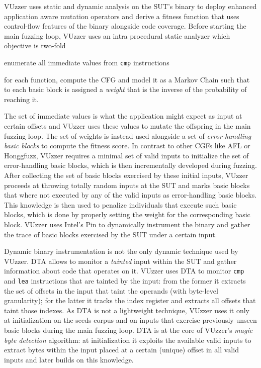 VUzzer uses static and dynamic analysis on the \ac{SUT}'s binary to deploy
enhanced application aware mutation operators and derive a fitness function that
uses control-flow features of the binary alongside code coverage. Before
starting the main fuzzing loop, VUzzer uses an intra procedural static analyzer
which objective is two-fold
\begin{enumeratein}
    \item enumerate all immediate values from \texttt{cmp} instructions
    \item for each function, compute the \ac{CFG} and model it as a Markov Chain
        such that to each basic block is assigned a \emph{weight} that is the
        inverse of the probability of reaching it.
\end{enumeratein}
The set of immediate values is what the application might expect as input at
certain offsets and VUzzer uses these values to mutate the offspring in the main
fuzzing loop. The set of weights is instead used alongside a set of
\emph{error-handling basic blocks} to compute the fitness score. In contrast to
other \acp{CGF} like AFL or Honggfuzz, VUzzer requires a minimal set of valid
inputs to initialize the set of error-handling basic blocks, which is then
incrementally developed during fuzzing. After collecting the set of basic blocks
exercised by these initial inputs, VUzzer proceeds at throwing totally random
inputs at the \ac{SUT} and marks basic blocks that where not executed by any of
the valid inputs as error-handling basic blocks. This knowledge is then used to
penalize individuals that execute such basic blocks, which is done by properly
setting the weight for the corresponding basic block. VUzzer uses Intel's Pin
\cite{luk2005pin} to dynamically instrument the binary and gather the trace of
basic blocks exercised by the \ac{SUT} under a certain input.

Dynamic binary instrumentation is not the only dynamic technique used by VUzzer.
\ac{DTA} allows to monitor a \emph{tainted} input within the \ac{SUT} and gather
information about code that operates on it. VUzzer uses \ac{DTA} to monitor
\texttt{cmp} and \texttt{lea} instructions that are tainted by the input: from
the former it extracts the set of offsets in the input that taint the operands
(with byte-level granularity); for the latter it tracks the index register and
extracts all offsets that taint those indexes. As \ac{DTA} is not a lightweight
technique, VUzzer uses it only at initialization on the seeds corpus and on
inputs that exercise previously unseen basic blocks during the main fuzzing
loop. \ac{DTA} is at the core of VUzzer's \emph{magic byte detection} algorithm:
at initialization it exploits the available valid inputs to extract bytes within
the input placed at a certain (unique) offset in all valid inputs and later
builds on this knowledge.

